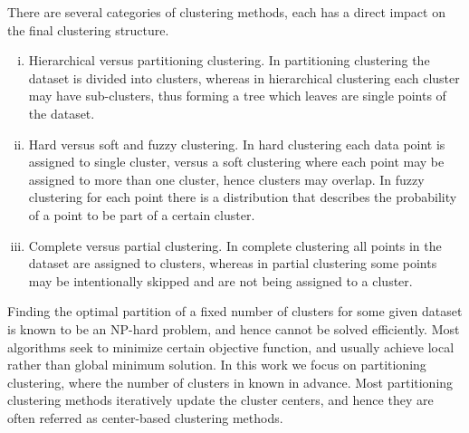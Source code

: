 There are several categories of clustering methods, each has a direct impact on the final clustering structure.
\begin{enumerate}[(i)]
	\item Hierarchical versus partitioning clustering. In partitioning clustering the dataset is divided into clusters, whereas in hierarchical clustering each cluster may have sub-clusters, thus forming a tree which leaves are single points of the dataset.
	\item Hard versus soft and fuzzy clustering. In hard clustering each data point is assigned to single cluster, versus a soft clustering where each point may be assigned to more than one cluster, hence clusters may overlap. In fuzzy clustering for each point there is a distribution that describes the probability of a point to be part of a certain cluster.
	\item Complete versus partial clustering. In complete clustering all points in the dataset are assigned to clusters, whereas in partial clustering some points may be intentionally skipped and are not being assigned to a cluster.
\end{enumerate}

Finding the optimal partition of a fixed number of clusters for some given dataset is known to be an NP-hard problem, and hence cannot be solved efficiently. Most algorithms seek to minimize certain objective function, and usually achieve local rather than global minimum solution. In this work we focus on partitioning clustering, where the number of clusters in known in advance. Most partitioning clustering methods iteratively update the cluster centers, and hence they are often referred as center-based clustering methods. \medskip

